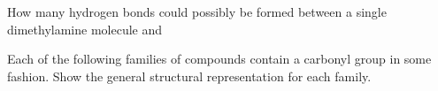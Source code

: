 \documentclass[addpoints, 12pt]{exam}
\begin{document}
\begin{questions}
\question[10] How many hydrogen bonds could possibly be formed between
a single dimethylamine molecule and



\question[10] Each of the following families of compounds contain a
carbonyl group in some fashion.  Show the general structural
representation for each family.





\end{questions}
\end{document}
